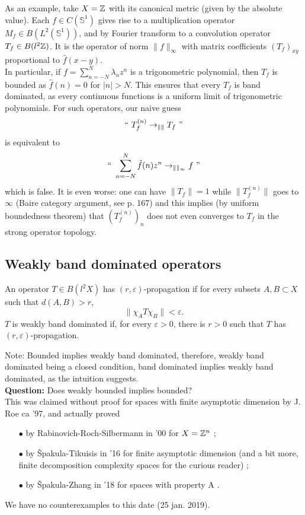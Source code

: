 As an example, take $X= \mathbb Z$ with its canonical metric (given by the absolute value). Each $f\in C(\mathbb S^1)$ gives rise to a multiplication operator $M_f\in B(L^2(\mathbb S^1 ))$, and by Fourier transform to a convolution operator $T_f\in B(l^2\mathbb Z)$. It is the operator of norm $\| f\|_\infty$ with matrix coefficients $(T_f)_{xy}$ proportional to $\hat f(x-y)$.\\
In particular, if $f= \sum_{n=-N}^N \lambda_n z^n$ is a trigonometric polynomial, then $T_f$ is bounded as $\hat f(n) =0$ for $|n| >N$. This ensures that every $T_f$ is band dominated, as every continuous functions is a uniform limit of trigonometric polynomials. For such operators, our naive guess 
\[ `` \ T^{(n)}_f \rightarrow_{\| \|} T_f \text{ ''}\]
is equivalent to 
\[``\ \sum_{n=-N}^N \hat f(n)z^n \rightarrow_{\|\|_\infty} f \text{ ''}\]
which is false. It is even worse: one can have $\| T_f \| = 1$ while $\|  T_f^{(n)} \| $ goes to $\infty$ (Baire category argument, see \cite{stein2003princeton} p. 167) and this implies (by uniform boundedness theorem) that $(T_f^{(n)})_n$ does not even converges to $T_f$ in the strong operator topology.\\

\subsection{Weakly band dominated operators}

\begin{definition}
An operator $T\in B(l^2 X)$ has $(r,\varepsilon)$-propagation if for every subsets $A,B\subset X$ such that $d(A,B)>r$, \[\| \chi_A T\chi_B\| <\varepsilon .\]
$T$ is weakly band dominated if, for every $\varepsilon >0$, there is $r>0$ such that $T$ has $(r,\varepsilon)$-propagation.
\end{definition}

Note: Bounded implies weakly band dominated, therefore, weakly band dominated being a closed condition, band dominated implies weakly band dominated, as the intuition suggests. \\

\textbf{Question:} Does weakly bounded implies bounded?\\

This was claimed without proof for spaces with finite asymptotic dimension by J. Roe ca '97, and actually proved
\begin{itemize}
\item[$\bullet$] by Rabinovich-Roch-Silbermann in '00 for $X=\mathbb Z^n$ \cite{rabinovich2001band};
\item[$\bullet$] by \v{S}pakula-Tikuisis in '16 for finite asymptotic dimension (and a bit more, finite decomposition complexity spaces for the curious reader) \cite{spakula2017relative};
\item[$\bullet$] by \v{S}pakula-Zhang in '18 for spaces with property A \cite{spakula2018quasi}.
\end{itemize}
We have no counterexamples to this date (25 jan. 2019).

